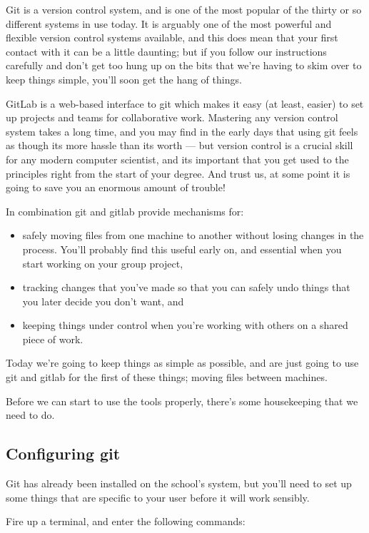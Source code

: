 Git is a version control system, and is one of the most popular of the thirty or so different systems in use today. It is arguably one of the most powerful and flexible version control systems available, and this does mean that your first contact with it can be a little daunting; but if you follow our instructions carefully and don't get too hung up on the bits that we're having to skim over to keep things simple, you'll soon get the hang of things. 

GitLab is a web-based interface to git which makes it easy (at least, easier) to set up projects and teams for collaborative work. Mastering any version control system takes a long time, and you may find in the early days that using git feels as though its more hassle than its worth --- but version control is a crucial skill for any modern computer scientist, and its important that you get used to the principles right from the start of your degree. And trust us, at some point it is going to save you an enormous amount of trouble!

In combination git and gitlab provide mechanisms for:
\begin{itemize}
\item safely moving files from one machine to another without losing changes in the process. You'll probably find this useful early on, and essential when you start working on your group project,
\item tracking changes that you've made so that you can safely undo things that you later decide you don't want, and
\item keeping things under control when you're working with others on a shared piece of work.
\end{itemize}

Today we're going to keep things as simple as possible, and are just going to use git and gitlab for the first of these things; moving files between machines. 

Before we can start to use the tools properly, there's some housekeeping that we need to do. 

\subsection{Configuring git}

Git has already been installed on the school's system, but you'll need to set up some things that are specific to your user before it will work sensibly. 

Fire up a terminal, and enter the following commands:


